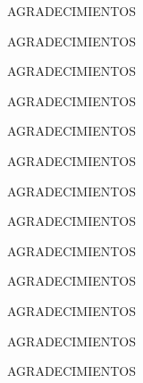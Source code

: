 %
\thispagestyle{empty}	
			


AGRADECIMIENTOS

AGRADECIMIENTOS

AGRADECIMIENTOS

AGRADECIMIENTOS

AGRADECIMIENTOS

AGRADECIMIENTOS

AGRADECIMIENTOS

AGRADECIMIENTOS

AGRADECIMIENTOS

AGRADECIMIENTOS

AGRADECIMIENTOS

AGRADECIMIENTOS

AGRADECIMIENTOS

